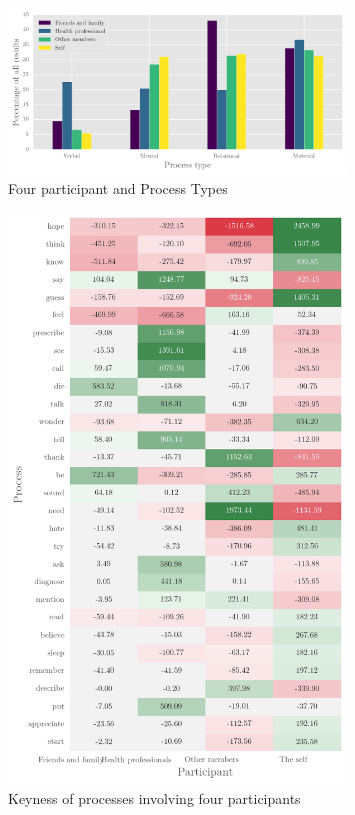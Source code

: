 \begin{figure}[htb]
  \centering
  \includegraphics[width=0.80\textwidth]{../images/process-types-for-part-types.png}
  \caption{Four participant and Process Types}
  \label{fig:process-types-for-part-types}
  \end{figure}

  \begin{figure}[p]
  \centering
  \includegraphics[width=0.80\textwidth]{../images/left_participant_in.png}
  \caption{Keyness of processes involving four participants}
  \label{fig:key_proc_for_parts2}
  \end{figure}

